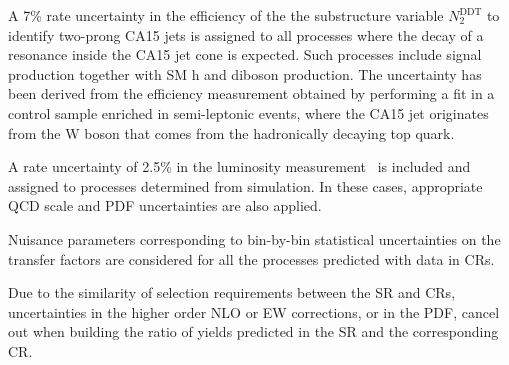 A 7\% rate uncertainty in the efficiency of the the substructure variable
$N_2^\text{DDT}$ to identify two-prong CA15 jets is assigned to all processes where the decay of a resonance inside the CA15 jet cone is expected. Such processes include signal production together with SM h and diboson production.  
The uncertainty has been derived from the efficiency measurement obtained by performing a fit in a control sample
enriched in semi-leptonic \ttbar events, where the CA15 jet originates
from the W boson that comes from the hadronically decaying top quark. 
%

A rate uncertainty of 2.5\% in the luminosity measurement~\cite{CMS-PAS-LUM-17-001} is included and assigned to processes determined from simulation. In these cases, appropriate QCD scale and PDF uncertainties are also applied.
%

Nuisance parameters corresponding to bin-by-bin statistical uncertainties on the transfer factors are considered for all the processes predicted with data in CRs. 
%

Due to the similarity of selection requirements between the SR and CRs, uncertainties in the higher order NLO or EW corrections, or in the PDF, cancel out when building the ratio of yields predicted in the SR and the corresponding CR.


